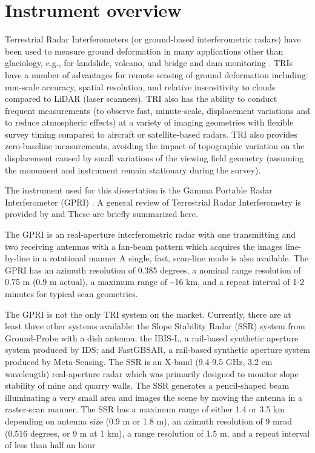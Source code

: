 \section{Instrument overview}
Terrestrial Radar Interferometers (or ground-based interferometric radars) have been used to measure ground deformation in many applications other than glaciology, e.g., for landslide, volcano, and bridge and dam monitoring \citep{luzi2010advanced,schulz2012kinematics,werner2012gpri, lowry2013high}. TRIs have a number of advantages for remote sensing of ground deformation including: mm-scale accuracy, spatial resolution, and relative insensitivity to clouds compared to LiDAR (laser scanners). TRI also has the ability to conduct frequent measurements (to observe fast, minute-scale, displacement variations and to reduce atmospheric effects) at a variety of imaging geometries with flexible survey timing compared to aircraft or satellite-based radars. TRI also provides zero-baseline measurements, avoiding the impact of topographic variation on the displacement caused by small variations of the viewing field geometry (assuming the monument and instrument remain stationary during the survey).

The instrument used for this dissertation is the Gamma Portable Radar Interferometer (GPRI) \citep{werner2008gamma,werner2012gpri}. A general review of Terrestrial Radar Interferometry is provided by \citet{caduff2014review} and \citet{monserrat2014review}  These are briefly summarized here. 

The  GPRI is an real-aperture interferometric radar with one transmitting and two receiving antennas with a fan-beam pattern which acquires the images line-by-line in a rotational manner A single, fast, scan-line mode is also available. The GPRI has an azimuth resolution of 0.385 degrees, a nominal range resolution of 0.75 m (0.9 m actual), a maximum range of \textasciitilde16 km, and a repeat interval of 1-2 minutes for typical scan geometries. 

The  GPRI is not the only TRI system on the market. Currently, there are at least three other systems available: the Slope Stability Radar (SSR) system from Ground-Probe with a dish antenna; the IBIS-L, a rail-based synthetic aperture system produced by IDS; and FastGBSAR, a rail-based synthetic aperture system produced by Meta-Sensing. 
The SSR is an X-band (9.4-9.5 GHz, 3.2 cm wavelength) real-aperture radar which was primarily designed to monitor slope stability of mine and quarry walls. The SSR generates a pencil-shaped beam illuminating a very small area and images the scene by moving the antenna in a raster-scan manner. The SSR has a maximum range of either 1.4 or 3.5 km depending on antenna size (0.9 m or 1.8 m), an azimuth resolution of 9 mrad (0.516 degrees, or 9 m at 1 km), a range resolution of 1.5 m, and a repeat interval of less than half an hour \citep{reeves2001slope,ssr}

